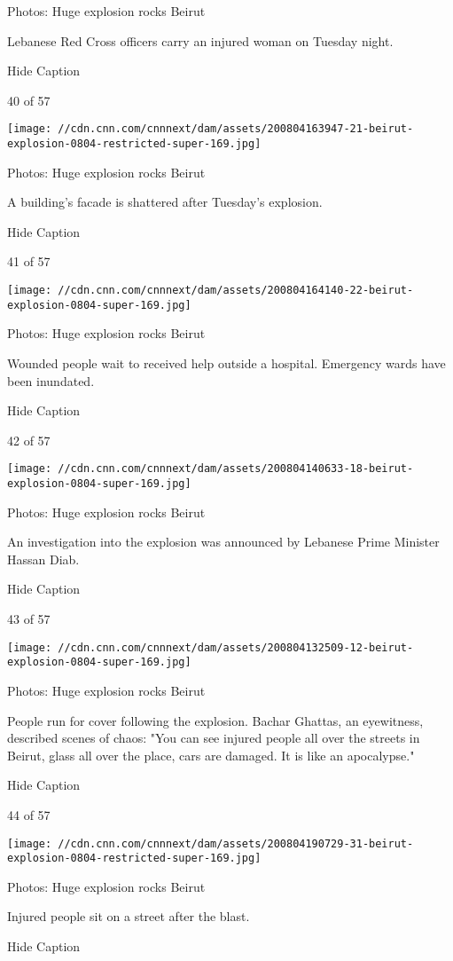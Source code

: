 Photos: Huge explosion rocks Beirut

Lebanese Red Cross officers carry an injured woman on Tuesday night.

Hide Caption

40 of 57

\texttt{[image: //cdn.cnn.com/cnnnext/dam/assets/200804163947-21-beirut-explosion-0804-restricted-super-169.jpg]}

Photos: Huge explosion rocks Beirut

A building's facade is shattered after Tuesday's explosion.

Hide Caption

41 of 57

\texttt{[image: //cdn.cnn.com/cnnnext/dam/assets/200804164140-22-beirut-explosion-0804-super-169.jpg]}

Photos: Huge explosion rocks Beirut

Wounded people wait to received help outside a hospital. Emergency wards
have been inundated.

Hide Caption

42 of 57

\texttt{[image: //cdn.cnn.com/cnnnext/dam/assets/200804140633-18-beirut-explosion-0804-super-169.jpg]}

Photos: Huge explosion rocks Beirut

An investigation into the explosion was announced by Lebanese Prime
Minister Hassan Diab.

Hide Caption

43 of 57

\texttt{[image: //cdn.cnn.com/cnnnext/dam/assets/200804132509-12-beirut-explosion-0804-super-169.jpg]}

Photos: Huge explosion rocks Beirut

People run for cover following the explosion. Bachar Ghattas, an
eyewitness, described scenes of chaos: "You can see injured people all
over the streets in Beirut, glass all over the place, cars are damaged.
It is like an apocalypse."

Hide Caption

44 of 57

\texttt{[image: //cdn.cnn.com/cnnnext/dam/assets/200804190729-31-beirut-explosion-0804-restricted-super-169.jpg]}

Photos: Huge explosion rocks Beirut

Injured people sit on a street after the blast.

Hide Caption

